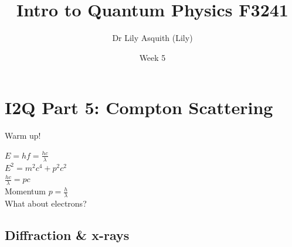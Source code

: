 


% 
\title[ Intro to Quantum Physics]{Intro to Quantum Physics F3241}
\author[Dr Lily Asquith (Lily)]{ Dr Lily Asquith (Lily)}
\date[Week 5]{ Week 5}





\begin{frame}
\titlepage
\end{frame} 


\section{I2Q Part 5: Compton Scattering}

 
 \begin{frame}{Warm up!}
\small

$E= hf= \frac{hc }{\lambda }$\\[2ex]

$E^2 = m^2 c^{4} +p^2c^2 $\\[2ex]

$\frac{ h c}{ \lambda} = pc$\\[2ex]

Momentum $p = \frac{ h}{ \lambda } $ \\[2ex]

What about electrons?\\
\end{frame}



\subsection{Diffraction \& x-rays}


